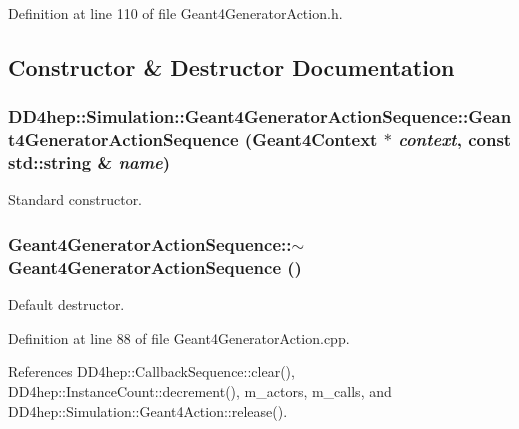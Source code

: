 Definition at line 110 of file Geant4GeneratorAction.h.

\subsection{Constructor \& Destructor Documentation}
\hypertarget{class_d_d4hep_1_1_simulation_1_1_geant4_generator_action_sequence_a6faeaf2816abecfd4fa39eef4d6cda9c}{
\subsubsection[{Geant4GeneratorActionSequence}]{\setlength{\rightskip}{0pt plus 5cm}DD4hep::Simulation::Geant4GeneratorActionSequence::Geant4GeneratorActionSequence ({\bf Geant4Context} $\ast$ {\em context}, \/  const std::string \& {\em name})}}
\label{class_d_d4hep_1_1_simulation_1_1_geant4_generator_action_sequence_a6faeaf2816abecfd4fa39eef4d6cda9c}


Standard constructor. \hypertarget{class_d_d4hep_1_1_simulation_1_1_geant4_generator_action_sequence_a69d6b2986aeafa1e9951700f4d023455}{
\subsubsection[{$\sim$Geant4GeneratorActionSequence}]{\setlength{\rightskip}{0pt plus 5cm}Geant4GeneratorActionSequence::$\sim$Geant4GeneratorActionSequence ()}}
\label{class_d_d4hep_1_1_simulation_1_1_geant4_generator_action_sequence_a69d6b2986aeafa1e9951700f4d023455}


Default destructor. 

Definition at line 88 of file Geant4GeneratorAction.cpp.

References DD4hep::CallbackSequence::clear(), DD4hep::InstanceCount::decrement(), m\_\-actors, m\_\-calls, and DD4hep::Simulation::Geant4Action::release().

